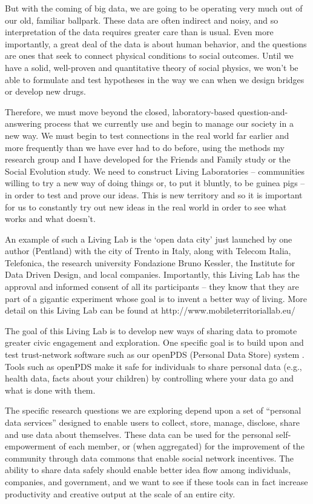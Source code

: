 But with the coming of big data, we are going to be operating very much out of our old, familiar ballpark. These data are often indirect and noisy, and so interpretation of the data requires greater care than is usual. Even more importantly, a great deal of the data is about human behavior, and the questions are ones that seek to connect physical conditions to social outcomes. Until we have a solid, well-proven and quantitative theory of social physics, we won’t be able to formulate and test hypotheses in the way we can when we design bridges or develop new drugs.

Therefore, we must move beyond the closed, laboratory-based question-and-answering process that we currently use and begin to manage our society in a new way. We must begin to test connections in the real world far earlier and more frequently than we have ever had to do before, using the methods my research group and I have developed for the Friends and Family study or the Social Evolution study. We need to construct Living Laboratories – communities willing to try a new way of doing things or, to put it bluntly, to be guinea pigs – in order to test and prove our ideas. This is new territory and so it is important for us to constantly try out new ideas in the real world in order to see what works and what doesn’t.

An example of such a Living Lab is the `open data city’ just launched by one author (Pentland) with the city of Trento in Italy, along with Telecom Italia, Telefonica, the research university Fondazione Bruno Kessler, the Institute for Data Driven Design, and local companies. Importantly, this Living Lab has the approval and informed consent of all its participants – they know that they are part of a gigantic experiment whose goal is to invent a better way of living. More detail on this Living Lab can be found at http://www.mobileterritoriallab.eu/

The goal of this Living Lab is to develop new ways of sharing data to promote greater civic engagement and exploration. One specific goal is to build upon and test trust-network software such as our openPDS (Personal Data Store) system . Tools such as openPDS make it safe for individuals to share personal data (e.g., health data, facts about your children) by controlling where your data go and what is done with them.

The specific research questions we are exploring depend upon a set of “personal data services” designed to enable users to collect, store, manage, disclose, share and use data about themselves. These data can be used for the personal self-empowerment of each member, or (when aggregated) for the improvement of the community through data commons that enable social network incentives. The ability to share data safely should enable better idea flow among individuals, companies, and government, and we want to see if these tools can in fact increase productivity and creative output at the scale of an entire city.

